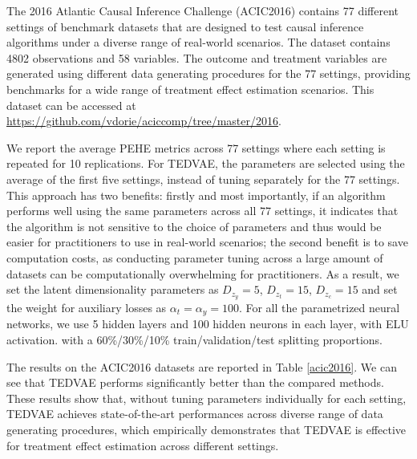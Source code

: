 \documentclass[letterpaper]{article} %
\begin{document}
The 2016 Atlantic Causal Inference Challenge (ACIC2016) \cite{Dorie2019} contains 77 different settings of benchmark datasets that are designed to test causal inference algorithms under a diverse range of real-world scenarios. 
The dataset contains 4802 observations and 58 variables. The outcome and treatment variables are generated using different data generating procedures for the 77 settings, providing benchmarks for a wide range of treatment effect estimation scenarios. This dataset can be accessed at \url{https://github.com/vdorie/aciccomp/tree/master/2016}. 

We report the average PEHE metrics across 77 settings where each setting is repeated for 10 replications. For TEDVAE, the parameters are selected using the average of the first five settings, instead of tuning separately for the 77 settings. This approach has two benefits: firstly and most importantly, if an algorithm performs well using the same parameters across all 77 settings, it indicates that the algorithm is not sensitive to the choice of parameters and thus would be easier for practitioners to use in real-world scenarios; the second benefit is to save computation costs, as conducting parameter tuning across a large amount of datasets can be computationally overwhelming for practitioners.
As a result, we set the latent dimensionality parameters as $D_{z_y}=5$, $D_{z_t}=15$, $D_{z_c}=15$ and set the weight for auxiliary losses as $\alpha_t=\alpha_y=100$. For all the parametrized neural networks, we use 5 hidden layers and 100 hidden neurons in each layer, with ELU activation.   with a 60\%/30\%/10\% train/validation/test splitting proportions.

The results on the ACIC2016 datasets are reported in Table \ref{acic2016}. We can see that TEDVAE performs significantly better than the compared methods.
These results show that, without tuning parameters individually for each setting, TEDVAE achieves state-of-the-art performances across diverse range of data generating procedures, which empirically demonstrates that TEDVAE is effective for treatment effect estimation across different settings.
\end{document}
